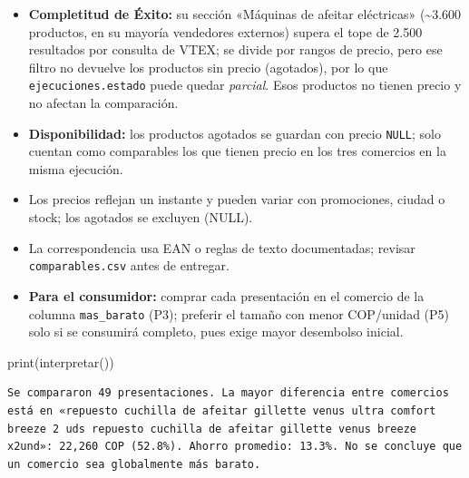 \documentclass[
  spanish,
  letterpaper,
  DIV=11,
  numbers=noendperiod]{scrartcl}
\newenvironment{Shaded}{\begin{snugshade}}{\end{snugshade}}
\newcommand{\BuiltInTok}[1]{\textcolor[rgb]{0.00,0.23,0.31}{#1}}
\newcommand{\NormalTok}[1]{\textcolor[rgb]{0.00,0.23,0.31}{#1}}
\begin{document}
\begin{itemize}
\item
  \textbf{Completitud de Éxito:} su sección «Máquinas de afeitar
  eléctricas» (\textasciitilde3.600 productos, en su mayoría vendedores
  externos) supera el tope de 2.500 resultados por consulta de VTEX; se
  divide por rangos de precio, pero ese filtro no devuelve los productos
  sin precio (agotados), por lo que \texttt{ejecuciones.estado} puede
  quedar \emph{parcial}. Esos productos no tienen precio y no afectan la
  comparación.
\item
  \textbf{Disponibilidad:} los productos agotados se guardan con precio
  \texttt{NULL}; solo cuentan como comparables los que tienen precio en
  los tres comercios en la misma ejecución.
\item
  Los precios reflejan un instante y pueden variar con promociones,
  ciudad o stock; los agotados se excluyen (NULL).
\item
  La correspondencia usa EAN o reglas de texto documentadas; revisar
  \texttt{comparables.csv} antes de entregar.
\item
  \textbf{Para el consumidor:} comprar cada presentación en el comercio
  de la columna \texttt{mas\_barato} (P3); preferir el tamaño con menor
  COP/unidad (P5) solo si se consumirá completo, pues exige mayor
  desembolso inicial.
\end{itemize}

\begin{Shaded}
\begin{Highlighting}[]
\BuiltInTok{print}\NormalTok{(interpretar())}
\end{Highlighting}
\end{Shaded}

\begin{verbatim}
Se compararon 49 presentaciones. La mayor diferencia entre comercios está en «repuesto cuchilla de afeitar gillette venus ultra comfort breeze 2 uds repuesto cuchilla de afeitar gillette venus breeze x2und»: 22,260 COP (52.8%). Ahorro promedio: 13.3%. No se concluye que un comercio sea globalmente más barato.
\end{verbatim}
\end{document}
